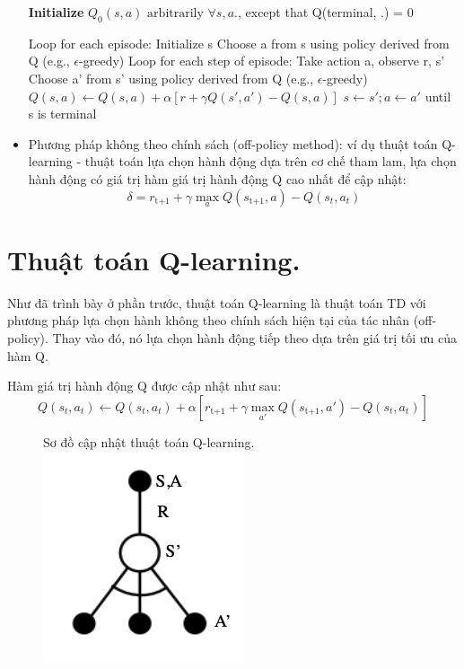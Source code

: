\documentclass{uetgraduation}
\begin{document}
\begin{itemize}
    \begin{algorithm}
        \caption{Thuật toán SARSA}\label{alg:sarsa}
        \begin{algorithmic}[1]
        \State \textbf{Initialize } $Q_0(s,a) \text{ arbitrarily } \forall s,a.$, except that Q(terminal, .) = 0
        
        \State Loop for each episode:
            \State \quad Initialize s
            \State \quad Choose a from s using policy derived from Q (e.g., $\epsilon$-greedy)
            \State \quad Loop for each step of episode:
                \State \quad \quad Take action a, observe r, s'
                \State \quad \quad Choose a' from s' using policy derived from Q (e.g., $\epsilon$-greedy)
                \State \quad \quad $Q(s, a) \leftarrow Q(s, a) + \alpha [r + \gamma Q (s', a') - Q(s, a)]$
                \State \quad \quad $s \leftarrow s'; a \leftarrow a'$
            \State \quad until s is terminal
    \end{algorithmic}
    \end{algorithm}

    \item Phương pháp không theo chính sách (off-policy method): ví dụ thuật toán Q-learning - thuật toán lựa chọn hành động dựa trên cơ chế tham lam, lựa chọn hành động có giá trị
    hàm giá trị hành động Q cao nhất để cập nhật:
    \[
    \delta = r_\text{t+1} + \gamma \max_{a} Q (s_\text{t+1}, a) - Q (s_t, a_t)
    \]

\end{itemize}

\section{Thuật toán Q-learning.}
Như đã trình bày ở phần trước, thuật toán Q-learning là thuật toán TD với phương pháp lựa chọn hành không theo chính sách hiện tại của tác nhân (off-policy). Thay vào đó,
nó lựa chọn hành động tiếp theo dựa trên giá trị tối ưu của hàm Q.

Hàm giá trị hành động Q được cập nhật như sau:
\[
Q (s_t, a_t) \leftarrow Q (s_t, a_t) + \alpha [r_\text{t+1} + \gamma \max_{a'} Q (s_\text{t+1}, a') - Q (s_t, a_t) ]
\]

\begin{figure}{Sơ đồ cập nhật thuật toán Q-learning.}
    \centering
    \includegraphics[scale=0.5]{q_learning_diagram}
    \label{fig:q_learning}
\end{figure}
\end{document}
